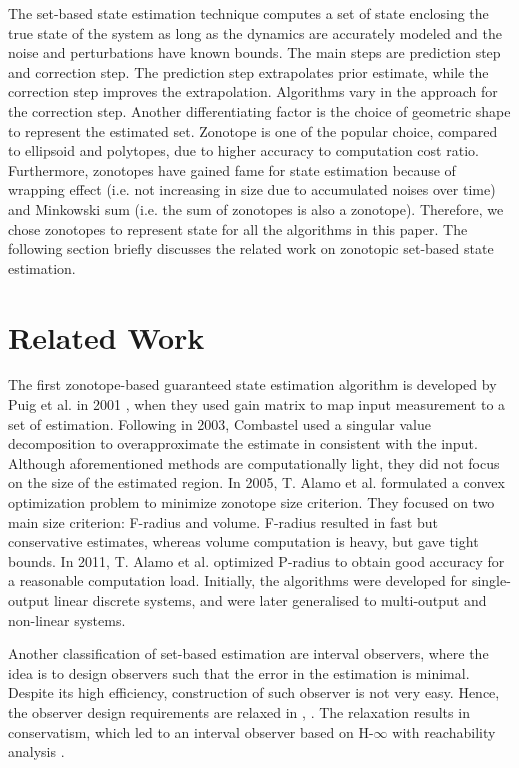 The set-based state estimation technique computes a set of state enclosing the true state of the system as long as the dynamics are accurately modeled and the noise and perturbations have known bounds. The main steps are prediction step and correction step. The prediction step extrapolates prior estimate, while the correction step improves the extrapolation. Algorithms vary in the approach for the correction step. Another differentiating factor is the choice of geometric shape to represent the estimated set. Zonotope is one of the popular choice, compared to ellipsoid and polytopes, due to higher accuracy to computation cost ratio. Furthermore, zonotopes have gained fame for state estimation because of wrapping effect (i.e. not increasing in size due to accumulated noises over time) and Minkowski sum (i.e. the sum of zonotopes is also a zonotope). Therefore, we chose zonotopes to represent state for all the algorithms in this paper. The following section briefly discusses the related work on zonotopic set-based state estimation.


\section{Related Work}
The first zonotope-based guaranteed state estimation algorithm is developed by Puig et al. in 2001 \cite{Puig2001}, when they used gain matrix to map input measurement to a set of estimation. Following in 2003, Combastel \cite{Combastel2003} used a singular value decomposition to overapproximate the estimate in consistent with the input. Although aforementioned methods are computationally light, they did not focus on the size of the estimated region. In 2005, T. Alamo et al. \cite{Alamo2005} formulated a convex optimization problem to minimize zonotope size criterion. They focused on two main size criterion: F-radius and volume. F-radius resulted in fast but conservative estimates, whereas volume computation is heavy, but gave tight bounds. In 2011, T. Alamo et al. \cite{Le2012} optimized P-radius to obtain good accuracy for a reasonable computation load. Initially, the algorithms were developed for single-output linear discrete systems, and were later generalised to multi-output and non-linear systems.  

Another classification of set-based estimation are interval observers, where the idea is to design observers such that the error in the estimation is minimal. Despite its high efficiency, construction of such observer is not very easy. Hence, the observer design requirements are relaxed in  \cite{Mazenc2011}, \cite{Raissi2012}. The relaxation results in conservatism, which led to an interval observer based on H-$\infty$ with reachability analysis \cite{Tang2019}.

